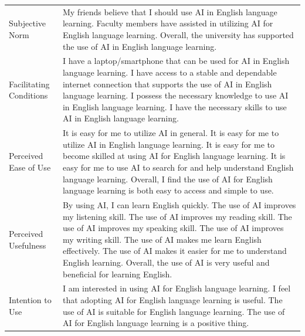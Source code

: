 \documentclass[english]{textolivre}
\begin{document}
\begin{center}
\begin{longtable}{>{\raggedright}p{3.5cm}p{11cm}}
Subjective Norm
&
My friends believe that I should use AI in English language learning.
\newline
Faculty members have assisted in utilizing AI for English language learning.
\newline
Overall, the university has supported the use of AI in English language learning.
\\[1.0em]

Facilitating Conditions
&
I have a laptop/smartphone that can be used for AI in English language learning.
\newline
I have access to a stable and dependable internet connection that supports the use of AI in English language learning.
\newline
I possess the necessary knowledge to use AI in English language learning.
\newline
I have the necessary skills to use AI in English language learning.
\\[1.0em]

Perceived Ease of Use
&
It is easy for me to utilize AI in general.
\newline
It is easy for me to utilize AI in English language learning.
\newline
It is easy for me to become skilled at using AI for English language learning.
\newline
It is easy for me to use AI to search for and help understand English language learning.
\newline
Overall, I find the use of AI for English language learning is both easy to access and simple to use.
\\[1.0em]

Perceived Usefulness
&
By using AI, I can learn English quickly.
\newline
The use of AI improves my listening skill.
\newline
The use of AI improves my reading skill.
\newline
The use of AI improves my speaking skill.
\newline
The use of AI improves my writing skill.
\newline
The use of AI makes me learn English effectively.
\newline
The use of AI makes it easier for me to understand English learning.
\newline
Overall, the use of AI is very useful and beneficial for learning English.
\\[1.0em]

Intention to Use
&
I am interested in using AI for English language learning.
\newline
I feel that adopting AI for English language learning is useful.
\newline
The use of AI is suitable for English language learning.
\newline
The use of AI for English language learning is a positive thing.
\\[1.0em]


\end{longtable}
\end{center}
\end{document}
